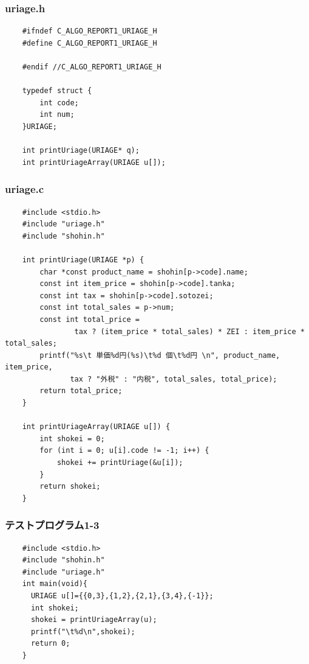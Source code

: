 \documentclass[10pt]{article}
\begin{document}
\subsubsection{uriage.h}
    \begin{lstlisting}
    #ifndef C_ALGO_REPORT1_URIAGE_H
    #define C_ALGO_REPORT1_URIAGE_H
    
    #endif //C_ALGO_REPORT1_URIAGE_H
    
    typedef struct {
        int code;
        int num;
    }URIAGE;
    
    int printUriage(URIAGE* q);
    int printUriageArray(URIAGE u[]);
    \end{lstlisting}
    \pagebreak
\subsubsection{uriage.c}
    \begin{lstlisting}
    #include <stdio.h>
    #include "uriage.h"
    #include "shohin.h"
    
    int printUriage(URIAGE *p) {
        char *const product_name = shohin[p->code].name;
        const int item_price = shohin[p->code].tanka;
        const int tax = shohin[p->code].sotozei;
        const int total_sales = p->num;
        const int total_price =
                tax ? (item_price * total_sales) * ZEI : item_price * total_sales;
        printf("%s\t 単価%d円(%s)\t%d 個\t%d円 \n", product_name, item_price,
               tax ? "外税" : "内税", total_sales, total_price);
        return total_price;
    }
        
    int printUriageArray(URIAGE u[]) {
        int shokei = 0;
        for (int i = 0; u[i].code != -1; i++) {
            shokei += printUriage(&u[i]);
        }
        return shokei;
    }
    \end{lstlisting}
\subsubsection{テストプログラム1-3}
\begin{lstlisting}
    #include <stdio.h>
    #include "shohin.h"
    #include "uriage.h"
    int main(void){
      URIAGE u[]={{0,3},{1,2},{2,1},{3,4},{-1}};
      int shokei;
      shokei = printUriageArray(u);
      printf("\t%d\n",shokei);
      return 0;
    }
\end{lstlisting}
\pagebreak
\end{document}
